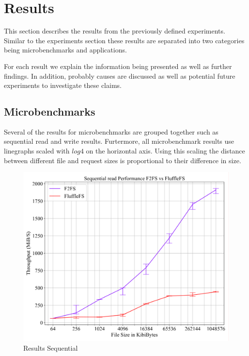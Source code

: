\chapter{Results}

This section describes the results from the previously defined experiments.
Similar to the experiments section these results are separated into two
categories being microbenchmarks and applications.

For each result we explain the information being presented as well as further
findings. In addition, probably causes are discussed as well as
potential future experiments to investigate these claims.

\section{Microbenchmarks}

Several of the results for microbenchmarks are grouped together such as
sequential read and write results. Furtermore, all microbenchmark results use
linegraphs scaled with $log4$ on the horizontal axis. Using this scaling the
distance between different file and request sizes is proportional to their
difference in size. 

\begin{figure}
    \centering
	\includegraphics[width=1\textwidth]{resources/images/results-sequential.pdf}
	\caption{Results Sequential}
    \label{figure:moduledependencies}
\end{figure}


